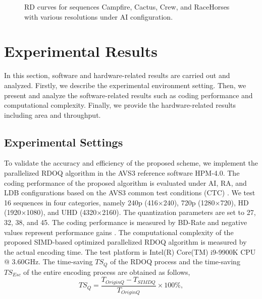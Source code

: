 \documentclass[lettersize,journal]{IEEEtran}
\begin{document}
\begin{figure}[!t]
	\caption{RD curves for sequences Campfire, Cactus, Crew, and RaceHorses with various resolutions under AI configuration.}
    \label{RD curves}
\end{figure}

\section{Experimental Results}
\label{sec:5}
In this section, software and hardware-related results are carried out and analyzed. Firstly, we describe the experimental environment setting. Then, we present and analyze the software-related results such as coding performance and computational complexity. Finally, we provide the hardware-related results including area and throughput. 

\subsection{Experimental Settings} 
To validate the accuracy and efficiency of the proposed scheme, we implement the parallelized RDOQ algorithm in the AVS3 reference software HPM-4.0. The coding performance of the proposed algorithm is evaluated under AI, RA, and LDB configurations based on the AVS3 common test conditions (CTC) \cite{AVS3CTC}. We test 16 sequences in four categories, namely 240p (416×240), 720p (1280×720), HD (1920×1080), and UHD (4320×2160). The quantization parameters are set to 27, 32, 38, and 45. The coding performance is measured by BD-Rate and negative values represent performance gains \cite{bjontegaard2001calculationofPSNR}. The computational complexity of the proposed SIMD-based optimized parallelized RDOQ algorithm is measured by the actual encoding time. The test platform is Intel(R) Core(TM) i9-9900K CPU @ 3.60GHz. The time-saving $TS_{Q}$ of the RDOQ process and the time-saving $TS_{Esc}$ of the entire encoding process are obtained as follows, 
\begin{equation}
	\label{TSQ}
    TS_{Q} = \frac{T_{OriginQ}-T_{SIMDQ}}{T_{OriginQ}} \times 100\%,
\end{equation}
\end{document}
